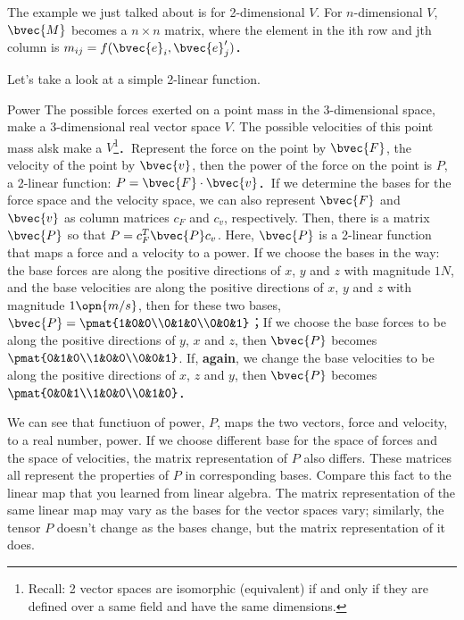 The example we just talked about is for 2-dimensional $V$. For $n$-dimensional $V$, $\bvec{M}$ becomes a $n\times n$ matrix, where the element in the ith row and jth column is $m_{ij}=f(\bvec{e}_i, \bvec{e}'_j)$．

Let's take a look at a simple 2-linear function. 

\begin{example}{Power}
The possible forces exerted on a point mass in the 3-dimensional space, make a 3-dimensional real vector space $V$. The possible velocities of this point mass alsk make a $V$\footnote{Recall: 2 vector spaces are isomorphic (equivalent) if and only if they are defined over a same field and have the same dimensions. }．Represent the force on the point by $\bvec{F}$, the velocity of the point by $\bvec{v}$, then the power of the force on the point is $P$, a 2-linear function: $P=\bvec{F}\cdot\bvec{v}$．If we determine the bases for the force space and the velocity space, we can also represent $\bvec{F}$ and $\bvec{v}$ as column matrices $c_F$ and $c_v$, respectively. Then, there is a matrix $\bvec{P}$ so that $P=c^T_F\bvec{P}c_v$. Here, $\bvec{P}$ is a 2-linear function that maps a force and a velocity to a power. If we choose the bases in the way: the base forces are along the positive directions of $x$, $y$ and $z$ with magnitude $1N$, and the base velocities are along the positive directions of $x$, $y$ and $z$ with magnitude $1\opn{m/s}$, then for these two bases, $\bvec{P}=\pmat{1&0&0\\0&1&0\\0&0&1}$；If we choose the base forces to be along the positive directions of $y$, $x$ and $z$, then $\bvec{P}$ becomes $\pmat{0&1&0\\1&0&0\\0&0&1}$. If, \textbf{again}, we change the base velocities to be along the positive directions of $x$, $z$ and $y$, then $\bvec{P}$ becomes $\pmat{0&0&1\\1&0&0\\0&1&0}$．
\end{example}



We can see that functiuon of power, $P$, maps the two vectors, force and velocity, to a real number, power. If we choose different base for the space of forces and the space of velocities, the matrix representation of $P$ also differs. These matrices all represent the properties of $P$ in corresponding bases. Compare this fact to the linear map that you learned from linear algebra. The matrix representation of the same linear map may vary as the bases for the vector spaces vary; similarly, the tensor $P$ doesn't change as the bases change, but the matrix representation of it does. 

